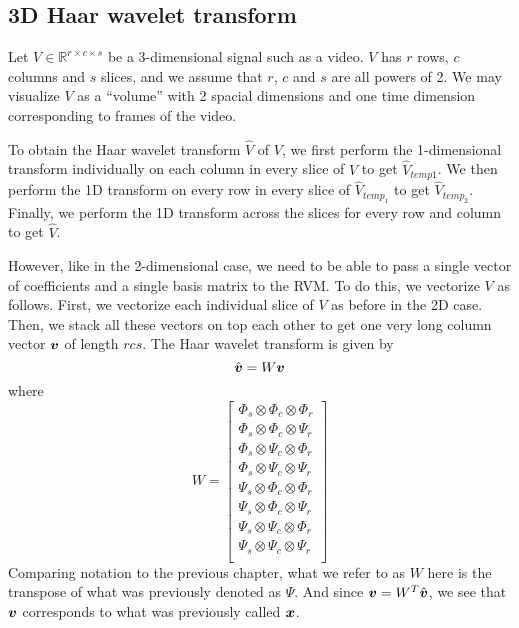 \subsection{3D Haar wavelet transform}
Let $V \in \mathbb{R}^{r\times c\times s}$ be a 3-dimensional signal such as a video. 
$V$ has $r$ rows, $c$ columns and $s$ slices, and we assume that $r$, $c$ and $s$ are all powers of 2. 
We may visualize $V$ as a ``volume'' with 2 spacial dimensions and one time dimension corresponding to frames of the video.

To obtain the Haar wavelet transform $\hat V$ of $V$, we first perform the 1-dimensional transform individually on each column in every slice of $V$ to get $\hat V_{temp1}$.
We then perform the 1D transform on every row in every slice of $\hat V_{temp_1}$ to get $\hat V_{temp_2}$.
Finally, we perform the 1D transform across the slices for every row and column to get $\hat V$.

However, like in the 2-dimensional case, we need to be able to pass a single vector of coefficients and a single basis matrix to the RVM.
To do this, we vectorize $V$ as follows. 
First, we vectorize each individual slice of $V$ as before in the 2D case.
Then, we stack all these vectors on top each other to get one very long column vector $\boldsymbol v$ of length $rcs$.
The Haar wavelet transform is given by 
\begin{equation*}
\hat{\boldsymbol v} = W \boldsymbol v
\end{equation*}
where 
\begin{equation*}
W = 
\begin{bmatrix}
\Phi_s \otimes \Phi_c \otimes \Phi_r \\
\Phi_s \otimes \Phi_c \otimes \Psi_r \\
\Phi_s \otimes \Psi_c \otimes \Phi_r \\
\Phi_s \otimes \Psi_c \otimes \Psi_r \\
\Psi_s \otimes \Phi_c \otimes \Phi_r \\
\Psi_s \otimes \Phi_c \otimes \Psi_r \\
\Psi_s \otimes \Psi_c \otimes \Phi_r \\
\Psi_s \otimes \Psi_c \otimes \Psi_r \\
\end{bmatrix}
\end{equation*}
Comparing notation to the previous chapter, what we refer to as $W$ here is the transpose of what was previously denoted as $\Psi$.
And since $\boldsymbol v = W^T \hat{\boldsymbol v}$, we see that $\boldsymbol v$ corresponds to what was previously called $\boldsymbol x$. 

